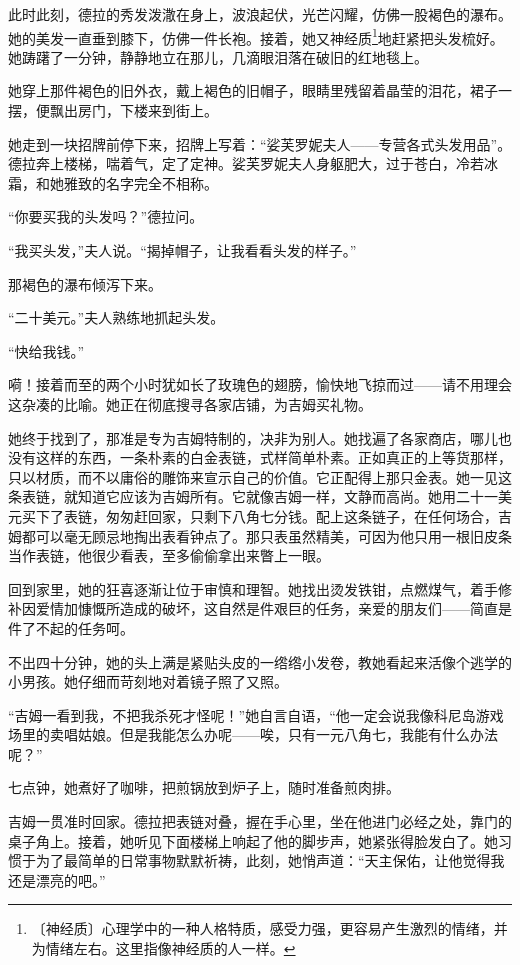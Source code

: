 \documentclass[12pt,UTF-8,openany]{ctexbook}
\begin{document}
\begin{large}
    此时此刻，德拉的秀发泼潵在身上，波浪起伏，光芒闪耀，仿佛一股褐色的瀑布。她的美发一直垂到膝下，仿佛一件长袍。接着，她又神经质\footnote{〔神经质〕心理学中的一种人格特质，感受力强，更容易产生激烈的情绪，并为情绪左右。这里指像神经质的人一样。}地赶紧把头发梳好。她踌躇了一分钟，静静地立在那儿，几滴眼泪落在破旧的红地毯上。
    
    她穿上那件褐色的旧外衣，戴上褐色的旧帽子，眼睛里残留着晶莹的泪花，裙子一摆，便飘出房门，下楼来到街上。
    
    她走到一块招牌前停下来，招牌上写着：“娑芙罗妮夫人——专营各式头发用品”。德拉奔上楼梯，喘着气，定了定神。娑芙罗妮夫人身躯肥大，过于苍白，冷若冰霜，和她雅致的名字完全不相称。
    
    “你要买我的头发吗？”德拉问。
    
    “我买头发，”夫人说。“揭掉帽子，让我看看头发的样子。”
    
    那褐色的瀑布倾泻下来。
    
    “二十美元。”夫人熟练地抓起头发。
    
    “快给我钱。”
    
    嗬！接着而至的两个小时犹如长了玫瑰色的翅膀，愉快地飞掠而过——请不用理会这杂凑的比喻。她正在彻底搜寻各家店铺，为吉姆买礼物。
    
    她终于找到了，那准是专为吉姆特制的，决非为别人。她找遍了各家商店，哪儿也没有这样的东西，一条朴素的白金表链，式样简单朴素。正如真正的上等货那样，只以材质，而不以庸俗的雕饰来宣示自己的价值。它正配得上那只金表。她一见这条表链，就知道它应该为吉姆所有。它就像吉姆一样，文静而高尚。她用二十一美元买下了表链，匆匆赶回家，只剩下八角七分钱。配上这条链子，在任何场合，吉姆都可以毫无顾忌地掏出表看钟点了。那只表虽然精美，可因为他只用一根旧皮条当作表链，他很少看表，至多偷偷拿出来瞥上一眼。
    
    回到家里，她的狂喜逐渐让位于审慎和理智。她找出烫发铁钳，点燃煤气，着手修补因爱情加慷慨所造成的破坏，这自然是件艰巨的任务，亲爱的朋友们——简直是件了不起的任务呵。
    
    不出四十分钟，她的头上满是紧贴头皮的一绺绺小发卷，教她看起来活像个逃学的小男孩。她仔细而苛刻地对着镜子照了又照。
    
    “吉姆一看到我，不把我杀死才怪呢！”她自言自语，“他一定会说我像科尼岛游戏场里的卖唱姑娘。但是我能怎么办呢——唉，只有一元八角七，我能有什么办法呢？”
    
    七点钟，她煮好了咖啡，把煎锅放到炉子上，随时准备煎肉排。
    
    吉姆一贯准时回家。德拉把表链对叠，握在手心里，坐在他进门必经之处，靠门的桌子角上。接着，她听见下面楼梯上响起了他的脚步声，她紧张得脸发白了。她习惯于为了最简单的日常事物默默祈祷，此刻，她悄声道：“天主保佑，让他觉得我还是漂亮的吧。”
    

\end{large}
\end{document}
